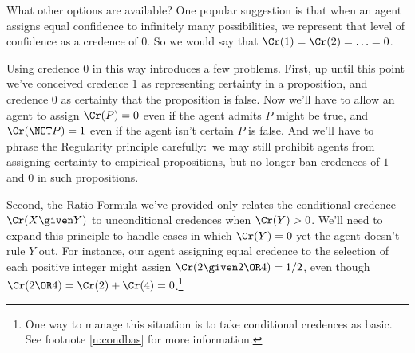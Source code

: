What other options are available? One popular suggestion is that when an agent assigns equal confidence to infinitely many possibilities, we represent that level of confidence as a credence of $0$. So we would say that $\Cr(1)=\Cr(2)=\ldots=0$.

Using credence $0$ in this way introduces a few problems. First, up until this point we've conceived credence $1$ as representing certainty in a proposition, and credence $0$ as certainty that the proposition is false. Now we'll have to allow an agent to assign $\Cr(P)=0$ even if the agent admits $P$ might be true, and $\Cr(\NOT P)=1$ even if the agent isn't certain $P$ is false. And we'll have to phrase the Regularity principle carefully:\ we may still prohibit agents from assigning certainty to empirical propositions, but no longer ban credences of $1$ and $0$ in such propositions. 

Second, the Ratio Formula we've provided only relates the conditional credence $\Cr(X \given Y)$ to unconditional credences when $\Cr(Y)>0$. We'll need to expand this principle to handle cases in which $\Cr(Y)=0$ yet the agent doesn't rule $Y$ out. For instance, our agent assigning equal credence to the selection of each positive integer might assign $\Cr(2 \given 2 \OR 4)=1/2$, even though $\Cr(2 \OR 4)=\Cr(2) + \Cr(4)=0$.\footnote
{One way to manage this situation is to take conditional credences as basic. See footnote \ref{n:condbas} for more information.}

